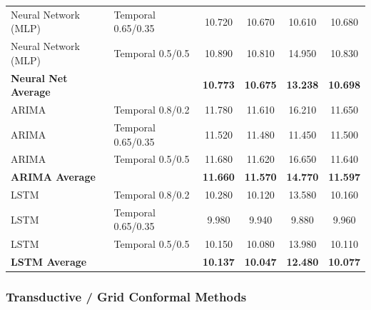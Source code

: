 \documentclass[11pt,a4paper]{article}
\begin{document}
\begin{table}[H]
\begin{tabular}{llcccc}
Neural Network (MLP) & Temporal 0.65/0.35 & 10.720 & 10.670 & 10.610 & 10.680 \\
Neural Network (MLP) & Temporal 0.5/0.5 & 10.890 & 10.810 & 14.950 & 10.830 \\
\textbf{Neural Net Average} & & \textbf{10.773} & \textbf{10.675} & \textbf{13.238} & \textbf{10.698} \\
\midrule
ARIMA & Temporal 0.8/0.2 & 11.780 & 11.610 & 16.210 & 11.650 \\
ARIMA & Temporal 0.65/0.35 & 11.520 & 11.480 & 11.450 & 11.500 \\
ARIMA & Temporal 0.5/0.5 & 11.680 & 11.620 & 16.650 & 11.640 \\
\textbf{ARIMA Average} & & \textbf{11.660} & \textbf{11.570} & \textbf{14.770} & \textbf{11.597} \\
\midrule
LSTM & Temporal 0.8/0.2 & 10.280 & 10.120 & 13.580 & 10.160 \\
LSTM & Temporal 0.65/0.35 & 9.980 & 9.940 & 9.880 & 9.960 \\
LSTM & Temporal 0.5/0.5 & 10.150 & 10.080 & 13.980 & 10.110 \\
\textbf{LSTM Average} & & \textbf{10.137} & \textbf{10.047} & \textbf{12.480} & \textbf{10.077} \\
\bottomrule
\end{tabular}
\end{table}

\subsubsection{Transductive / Grid Conformal Methods}
\end{document}
